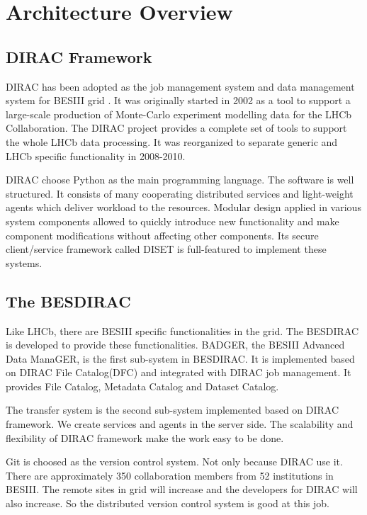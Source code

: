 \section{Architecture Overview}

\subsection{DIRAC Framework}

DIRAC \cite{bib:dirac3} 
has been adopted as the job management system and data management
system for BESIII grid \cite{bib:besdfc}. 
It was originally started in 2002 as a tool
to support a large-scale production of Monte-Carlo experiment modelling
data for the LHCb Collaboration. The DIRAC project provides a 
complete set of tools to support the whole LHCb data processing.
It was reorganized to separate generic and LHCb specific functionality
in 2008-2010.

DIRAC choose Python as the main programming language.
The software is well structured. 
It consists of many cooperating distributed services and light-weight
agents which deliver workload to the resources.
Modular design applied in various system components allowed to quickly
introduce new functionality and make component modifications without
affecting other components.
Its secure client/service framework called DISET \cite{bib:diset} 
is full-featured to implement these systems.

\subsection{The BESDIRAC}

Like LHCb, there are BESIII specific functionalities in the grid.
The BESDIRAC \cite{bib:besdirac} 
is developed to provide these functionalities.
BADGER, the BESIII Advanced Data ManaGER, is the first sub-system
in BESDIRAC. It is implemented based on DIRAC File Catalog(DFC)
and integrated with DIRAC job management.
It provides File Catalog, Metadata Catalog and Dataset Catalog.

The transfer system is the second sub-system implemented based on
DIRAC framework. We create services and agents in the server side.
The scalability and flexibility of DIRAC framework make the work
easy to be done. 

Git \cite{bib:git} is choosed as the version control system.
Not only because DIRAC use it. There are approximately 350
collaboration members from 52 institutions in BESIII.
The remote sites in grid will increase and the developers for DIRAC
will also increase. So the distributed version control system 
is good at this job.


